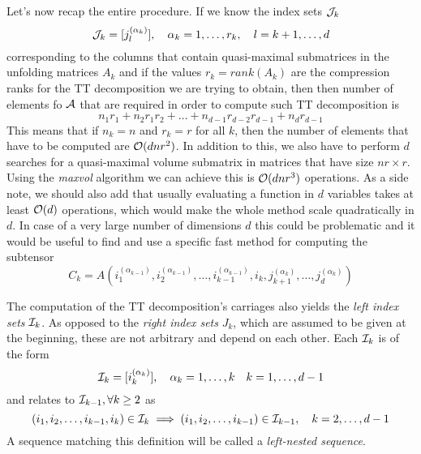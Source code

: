 Let's now recap the entire procedure. If we know the index sets $\mathcal{J}_k$
\begin{equation}
  \mathcal{J}_k = [j_l^{(\alpha_k)}],\quad \alpha_k = 1,\ldots,r_k,\quad l = k+1,\ldots,d
\end{equation}
corresponding to the columns that contain quasi-maximal submatrices in the unfolding matrices $A_k$ and if the values $r_k = rank(A_k)$ are the compression ranks for the TT decomposition we are trying to obtain, then then number of elements fo $\mathcal{A}$ that are required in order to compute such TT decomposition is
\begin{equation*}
  n_1 r_1 + n_2 r_1 r_2 + \ldots + n_{d-1} r_{d-2} r_{d-1} + n_d r_{d-1}
\end{equation*}
This means that if $n_k = n$ and $r_k = r$ for all $k$, then the number of elements that have to be computed are $\mathcal{O}(dnr^2)$.
In addition to this, we also have to perform $d$ searches for a quasi-maximal volume submatrix in matrices that have size $nr \times r$. Using the \emph{maxvol} algorithm we can achieve this is $\mathcal{O}(dnr^3)$ operations.
As a side note, we should also add that usually evaluating a function in $d$ variables takes at least $\mathcal{O}(d)$ operations, which would make the whole method scale quadratically in $d$. In case of a very large number of dimensions $d$ this could be problematic and it would be useful to find and use a specific fast method for computing the subtensor
\begin{equation}
  C_k = A(i_1^{(\alpha_{k-1})},i_2^{(\alpha_{k-1})},\ldots,i_{k-1}^{(\alpha_{k-1})},i_k,j_{k+1}^{(\alpha_k)},\ldots,j_d^{(\alpha_k)})
\end{equation}

The computation of the TT decomposition's carriages also yields the \emph{left index sets} $\mathcal{I}_k$. As opposed to the \emph{right index sets} $J_k$, which are assumed to be given at the beginning, these are not arbitrary and depend on each other. Each $\mathcal{I}_k$ is of the form
\begin{equation}
  \mathcal{I}_k = [i_k^{(\alpha_k)}], \quad \alpha_k = 1,\ldots,k \quad k = 1,\ldots,d-1
\end{equation}
and relates to $\mathcal{I}_{k-1}, \forall k \geq 2$ as
\begin{equation}
  (i_1,i_2,\ldots,i_{k-1},i_k) \in \mathcal{I}_k \implies (i_1,i_2,\ldots,i_{k-1}) \in \mathcal{I}_{k-1}, \quad k=2,\ldots,d-1
\end{equation}
A sequence matching this definition will be called a \emph{left-nested sequence}.

